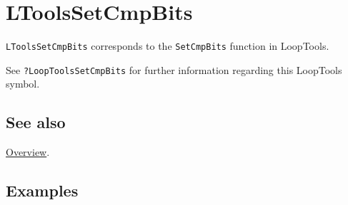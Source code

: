 \documentclass[../FeynHelpersManual.tex]{subfiles}
\begin{document}
\hypertarget{ltoolssetcmpbits}{
\section{LToolsSetCmpBits}\label{ltoolssetcmpbits}}

\texttt{LToolsSetCmpBits} corresponds to the \texttt{SetCmpBits}
function in LoopTools.

See \texttt{?LoopTools\textasciigrave SetCmpBits} for further
information regarding this LoopTools symbol.

\subsection{See also}

\hyperlink{toc}{Overview}.

\subsection{Examples}
\end{document}
